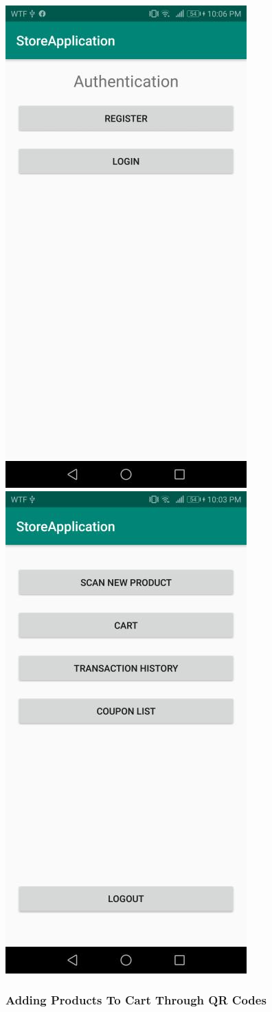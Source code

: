 \documentclass[12pt]{article}
\begin{document}
\begin{center}
\includegraphics[width=0.35\linewidth]{Images/Client/ClientAuthMenu.jpg}
\includegraphics[width=0.35\linewidth]{Images/Client/ClientMainMenu.jpg}
\end{center}

\subsubsection{Adding Products To Cart Through QR Codes}
\hspace{0.6cm}
\end{document}

